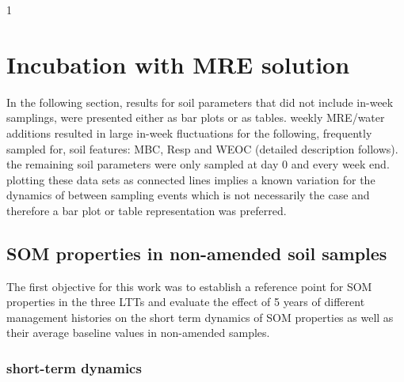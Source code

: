 \documentclass[12pt]{report}
\begin{document}
		
		

1\section{Incubation with MRE solution}

In the following section, results for soil parameters that did not include in-week samplings, were presented either as bar plots  or as tables.	weekly MRE/water additions resulted in large in-week fluctuations for the following, frequently sampled for, soil features: MBC, Resp and WEOC (detailed description follows). the remaining soil parameters were only sampled at day 0 and every week end. plotting these data sets as connected lines implies a known variation for the dynamics of between sampling events which is not necessarily the case and therefore a bar plot or table representation was preferred.

\subsection{SOM properties in non-amended soil samples}

	The first objective for this work was to establish a reference point  for SOM properties in the three LTTs and evaluate the effect of 5 years of different management histories on the short term dynamics of SOM properties as well as their average baseline values in non-amended samples.
	
	\subsubsection{short-term dynamics}
		
\end{document}
